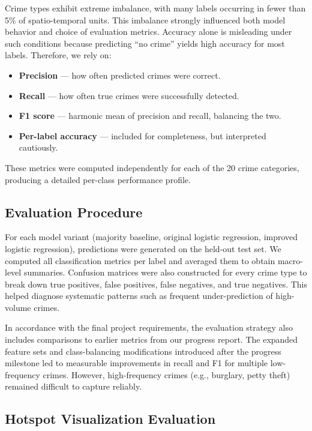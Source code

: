 \documentclass[11pt]{article}
\begin{document}
Crime types exhibit extreme imbalance, with many labels occurring in fewer than 5\% of spatio-temporal units. This imbalance strongly influenced both model behavior and choice of evaluation metrics. Accuracy alone is misleading under such conditions because predicting ``no crime'' yields high accuracy for most labels. Therefore, we rely on:\\
\begin{itemize}
    \item \textbf{Precision} — how often predicted crimes were correct.
    \item \textbf{Recall} — how often true crimes were successfully detected.
    \item \textbf{F1 score} — harmonic mean of precision and recall, balancing the two.
    \item \textbf{Per-label accuracy} — included for completeness, but interpreted cautiously.
\end{itemize}

These metrics were computed independently for each of the 20 crime categories, producing a detailed per-class performance profile.

\subsection{Evaluation Procedure}

For each model variant (majority baseline, original logistic regression, improved logistic regression), predictions were generated on the held-out test set. We computed all classification metrics per label and averaged them to obtain macro-level summaries. Confusion matrices were also constructed for every crime type to break down true positives, false positives, false negatives, and true negatives. This helped diagnose systematic patterns such as frequent under-prediction of high-volume crimes.

In accordance with the final project requirements, the evaluation strategy also includes comparisons to earlier metrics from our progress report. The expanded feature sets and class-balancing modifications introduced after the progress milestone led to measurable improvements in recall and F1 for multiple low-frequency crimes. However, high-frequency crimes (e.g., burglary, petty theft) remained difficult to capture reliably.

\subsection{Hotspot Visualization Evaluation}
\end{document}
